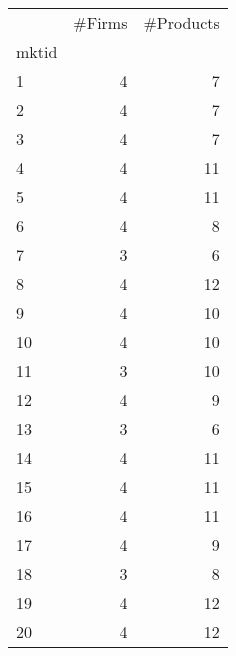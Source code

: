 \begin{tabular}{lrr}
\toprule
{} &  \#Firms &  \#Products \\
mktid &         &            \\
\midrule
1     &       4 &          7 \\
2     &       4 &          7 \\
3     &       4 &          7 \\
4     &       4 &         11 \\
5     &       4 &         11 \\
6     &       4 &          8 \\
7     &       3 &          6 \\
8     &       4 &         12 \\
9     &       4 &         10 \\
10    &       4 &         10 \\
11    &       3 &         10 \\
12    &       4 &          9 \\
13    &       3 &          6 \\
14    &       4 &         11 \\
15    &       4 &         11 \\
16    &       4 &         11 \\
17    &       4 &          9 \\
18    &       3 &          8 \\
19    &       4 &         12 \\
20    &       4 &         12 \\
\bottomrule
\end{tabular}
